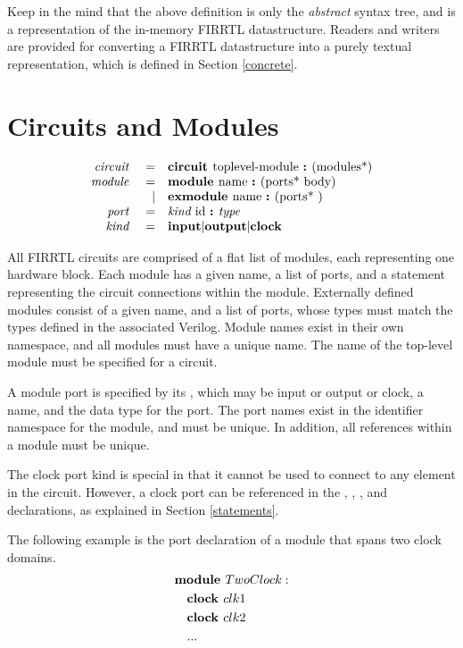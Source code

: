 \documentclass[12pt]{article}
\begin{document}
Keep in the mind that the above definition is only the {\em abstract} syntax tree, and is a representation of the in-memory FIRRTL datastructure.
Readers and writers are provided for converting a FIRRTL datastructure into a purely textual representation, which is defined in Section \ref{concrete}.


\section{Circuits and Modules}
\[
\begin{array}{rrl}
\text{\em circuit\ }    &=     &\text{\bf circuit\ } \text{toplevel-module } \text{\bf :\ } (\text{modules*}) \\
\text{\em module\ }     &=     &\text{\bf module\ }  \text{name } \text{\bf :\ } (\text{ports* } \text{body}) \\
                &\vert &\text{\bf exmodule\ }  \text{name } \text{\bf :\ } (\text{ports* })           \\ 
\text{\em port\ }       &=     &\text{\em kind\ } \text{id } \text{\bf :\ } \text{\em type\ }                                 \\
\text{\em kind\ }       &=     &\text{\bf input} \vert \text{\bf output} \vert \text{\bf clock}              \\
\end{array}
\]

All FIRRTL circuits are comprised of a flat list of modules, each representing one hardware block.
Each module has a given name, a list of ports, and a statement representing the circuit connections within the module.
Externally defined modules consist of a given name, and a list of ports, whose types must match the types defined in the associated Verilog.
Module names exist in their own namespace, and all modules must have a unique name. The name of the top-level module must be specified for a circuit.

A module port is specified by its , which may be input or output or clock, a name, and the data type for the port.
The port names exist in the identifier namespace for the module, and must be unique.
In addition, all references within a module must be unique.

The clock port kind is special in that it cannot be used to connect to any element in the circuit.
However, a clock port can be referenced in the , , , and  declarations, as explained in Section \ref{statements}.

The following example is the port declaration of a module that spans two clock domains.
\[
\begin{aligned}
&\text{\bf module\ } TwoClock : \\
&\quad \text{\bf clock\ } clk1 \\
&\quad \text{\bf clock\ } clk2 \\
&\quad ... \\
\end{aligned}
\]
\end{document}
